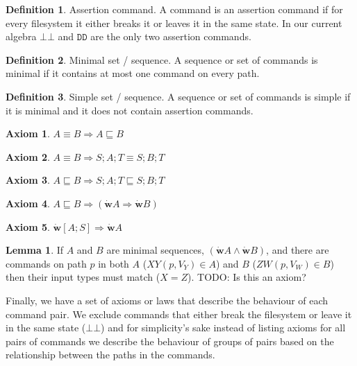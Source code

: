 \documentclass[12pt]{article}
\newcommand{\empt}{\bot}
\newcommand{\fscommand}[2]{{#1#2}}
\newcommand{\fsregcommandchar}[1]{\mathtt{#1}}
\newcommand{\fsregcommand}[2]{\fscommand{\fsregcommandchar{#1}}{\fsregcommandchar{#2}}}
\newcommand{\cbb}{\fsregcommand{\empt}{\empt}}
\newcommand{\cdd}{\fsregcommand{D}{D}}
\newcommand{\cxy}{\fscommand{X}{Y}}
\newcommand{\czw}{\fscommand{Z}{W}}
\newcommand{\eqext}{\sqsubseteq}
\newcommand{\works}{\dot{\mathbf{w}}}
\theoremstyle{definition}
\newtheorem{mydef}{Definition}
\newtheorem{myax}{Axiom}
\newtheorem{mylem}{Lemma}
\begin{document}
\begin{mydef}{Assertion command.}
A command is an assertion command if
for every filesystem it either breaks it or leaves it in the same state.
In our current algebra $\cbb$ and $\cdd$ are the only two assertion commands.
\end{mydef}

\begin{mydef}{Minimal set / sequence.}
A sequence or set of commands is minimal if it contains at most one command on every path.
\end{mydef}

\begin{mydef}{Simple set / sequence.}
A sequence or set of commands is simple if it is minimal and it does not contain assertion commands.
\end{mydef}

\begin{myax}
$A\equiv B \Rightarrow A\eqext B$
\end{myax}

\begin{myax}
$A\equiv B \Rightarrow S;A;T\equiv S;B;T$
\end{myax}

\begin{myax}
$A\eqext B \Rightarrow S;A;T\eqext S;B;T$
\end{myax}

\begin{myax}
$A\eqext B \Rightarrow (\works A \Rightarrow \works B)$
\end{myax}

\begin{myax}\label{worksextpostfix}
$\works[A;S] \Rightarrow \works A$
\end{myax}

\begin{mylem}\label{worksinputmatch}
If $A$ and $B$ are minimal sequences, $(\works A\wedge \works B)$,
and there are commands on path $p$ in both $A$ ($\cxy(p, V_Y)\in A$) and $B$ ($\czw(p, V_W)\in B$)
then their input types must match ($X=Z$).
TODO: Is this an axiom?
\end{mylem}






Finally, we have a set of axioms or laws that describe the behaviour
of each command pair. We exclude commands that either break the
filesystem or leave it in the same state ($\cbb$) and for
simplicity's sake instead of listing axioms for all pairs of commands
we describe the behaviour of groups of pairs
based on the relationship between the paths in the commands.
\end{document}
